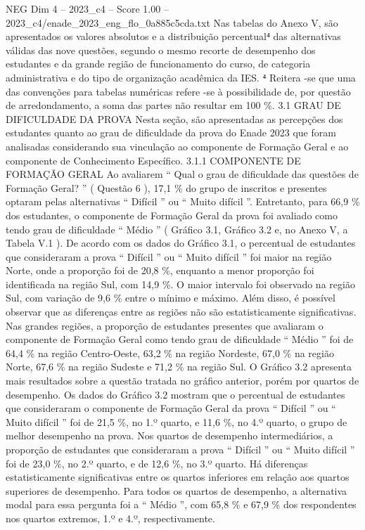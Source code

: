 \begin{textsample}{NEG Dim 4 – 2023\_c4 – Score 1.00 – 2023\_c4/enade\_2023\_eng\_flo\_0a885c5cda.txt}
Nas tabelas do Anexo V, são apresentados os valores absolutos e a distribuição percentual⁴ das alternativas válidas das nove questões, segundo o mesmo recorte de desempenho dos estudantes e da grande região de funcionamento do curso, de categoria administrativa e do tipo de organização acadêmica da IES. ⁴ Reitera -se que uma das convenções para tabelas numéricas refere -se à possibilidade de, por questão de arredondamento, a soma das partes não resultar em 100 \%. 3.1 GRAU DE DIFICULDADE DA PROVA Nesta seção, são apresentadas as percepções dos estudantes quanto ao grau de dificuldade da prova do Enade 2023 que foram analisadas considerando sua vinculação ao componente de Formação Geral e ao componente de Conhecimento Específico. 3.1.1 COMPONENTE DE FORMAÇÃO GERAL Ao avaliarem “ Qual o grau de dificuldade das questões de Formação Geral? ” ( Questão 6 ), 17,1 \% do grupo de inscritos e presentes optaram pelas alternativas “ Difícil ” ou “ Muito difícil ”.
Entretanto, para 66,9 \% dos estudantes, o componente de Formação Geral da prova foi avaliado como tendo grau de dificuldade “ Médio ” ( Gráfico 3.1, Gráfico 3.2 e, no Anexo V, a Tabela V.1 ).
De acordo com os dados do Gráfico 3.1, o percentual de estudantes que consideraram a prova “ Difícil ” ou “ Muito difícil ” foi maior na região Norte, onde a proporção foi de 20,8 \%, enquanto a menor proporção foi identificada na região Sul, com 14,9 \%.
O maior intervalo foi observado na região Sul, com variação de 9,6 \% entre o mínimo e máximo.
Além disso, é possível observar que as diferenças entre as regiões não são estatisticamente significativas.
Nas grandes regiões, a proporção de estudantes presentes que avaliaram o componente de Formação Geral como tendo grau de dificuldade “ Médio ” foi de 64,4 \% na região Centro-Oeste, 63,2 \% na região Nordeste, 67,0 \% na região Norte, 67,6 \% na região Sudeste e 71,2 \% na região Sul.
O Gráfico 3.2 apresenta mais resultados sobre a questão tratada no gráfico anterior, porém por quartos de desempenho.
Os dados do Gráfico 3.2 mostram que o percentual de estudantes que consideraram o componente de Formação Geral da prova “ Difícil ” ou “ Muito difícil ” foi de 21,5 \%, no 1.º quarto, e 11,6 \%, no 4.º quarto, o grupo de melhor desempenho na prova.
Nos quartos de desempenho intermediários, a proporção de estudantes que consideraram a prova “ Difícil ” ou “ Muito difícil ” foi de 23,0 \%, no 2.º quarto, e de 12,6 \%, no 3.º quarto.
Há diferenças estatisticamente significativas entre os quartos inferiores em relação aos quartos superiores de desempenho.
Para todos os quartos de desempenho, a alternativa modal para essa pergunta foi a “ Médio ”, com 65,8 \% e 67,9 \% dos respondentes nos quartos extremos, 1.º e 4.º, respectivamente.

\end{textsample}
